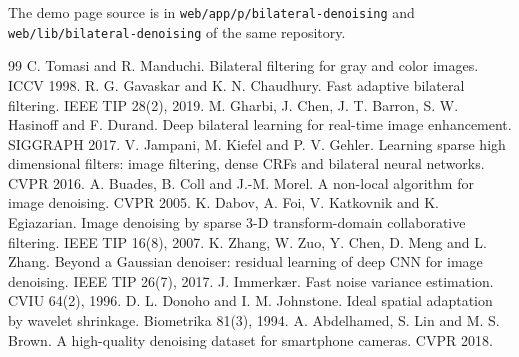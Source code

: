 \documentclass[11pt,a4paper]{article}
\begin{document}
The demo page source is in \texttt{web/app/p/bilateral-denoising} and
\texttt{web/lib/bilateral-denoising} of the same repository.

\begin{thebibliography}{99}
\small
{} C. Tomasi and R. Manduchi. Bilateral filtering for gray and color images. ICCV 1998.
 R. G. Gavaskar and K. N. Chaudhury. Fast adaptive bilateral filtering. IEEE TIP 28(2), 2019.
 M. Gharbi, J. Chen, J. T. Barron, S. W. Hasinoff and F. Durand. Deep bilateral learning for
real-time image enhancement. SIGGRAPH 2017.
 V. Jampani, M. Kiefel and P. V. Gehler. Learning sparse high dimensional filters: image
filtering, dense CRFs and bilateral neural networks. CVPR 2016.
 A. Buades, B. Coll and J.-M. Morel. A non-local algorithm for image denoising. CVPR 2005.
 K. Dabov, A. Foi, V. Katkovnik and K. Egiazarian. Image denoising by sparse 3-D
transform-domain collaborative filtering. IEEE TIP 16(8), 2007.
 K. Zhang, W. Zuo, Y. Chen, D. Meng and L. Zhang. Beyond a Gaussian denoiser: residual
learning of deep CNN for image denoising. IEEE TIP 26(7), 2017.
 J. Immerk\ae r. Fast noise variance estimation. CVIU 64(2), 1996.
 D. L. Donoho and I. M. Johnstone. Ideal spatial adaptation by wavelet shrinkage.
Biometrika 81(3), 1994.
 A. Abdelhamed, S. Lin and M. S. Brown. A high-quality denoising dataset for smartphone
cameras. CVPR 2018.
\end{thebibliography}
\end{document}
